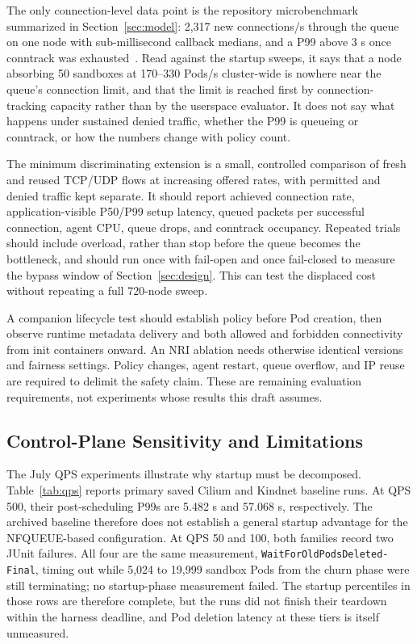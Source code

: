 \documentclass[letterpaper,twocolumn,10pt]{article}
\begin{document}
The only connection-level data point is the repository microbenchmark
summarized in Section~\ref{sec:model}: 2,317 new connections/s through
the queue on one node with sub-millisecond callback medians, and a P99
above 3 s once conntrack was exhausted~\cite{knptesting}. Read against
the startup sweeps, it says that a node absorbing 50 sandboxes at
170--330 Pods/s cluster-wide is nowhere near the queue's connection
limit, and that the limit is reached first by connection-tracking
capacity rather than by the userspace evaluator. It does not say what
happens under sustained denied traffic, whether the P99 is queueing or
conntrack, or how the numbers change with policy count.

The minimum discriminating extension is a small, controlled comparison
of fresh and reused TCP/UDP flows at increasing offered rates, with
permitted and denied traffic kept separate. It should report achieved
connection rate, application-visible P50/P99 setup latency, queued
packets per successful connection, agent CPU, queue drops, and conntrack
occupancy. Repeated trials should include overload, rather than stop
before the queue becomes the bottleneck, and should run once with
fail-open and once fail-closed to measure the bypass window of
Section~\ref{sec:design}. This can test the displaced cost without
repeating a full 720-node sweep.

A companion lifecycle test should establish policy before Pod creation,
then observe runtime metadata delivery and both allowed and forbidden
connectivity from init containers onward. An NRI ablation needs otherwise
identical versions and fairness settings. Policy changes, agent restart,
queue overflow, and IP reuse are required to delimit the safety claim.
These are remaining evaluation requirements, not experiments whose
results this draft assumes.

\subsection{Control-Plane Sensitivity and Limitations}
The July QPS experiments illustrate why startup must be decomposed.
Table~\ref{tab:qps} reports primary saved Cilium and Kindnet baseline
runs. At QPS 500, their post-scheduling P99s are 5.482 s and 57.068 s,
respectively. The archived baseline therefore does not establish a
general startup advantage for the NFQUEUE-based configuration. At
QPS 50 and 100, both families record two JUnit failures. All four are
the same measurement, \texttt{WaitForOldPodsDeleted-Final}, timing out
while 5,024 to 19,999 sandbox Pods from the churn phase were still
terminating; no startup-phase measurement failed. The startup
percentiles in those rows are therefore complete, but the runs did not
finish their teardown within the harness deadline, and Pod deletion
latency at these tiers is itself unmeasured.
\end{document}
